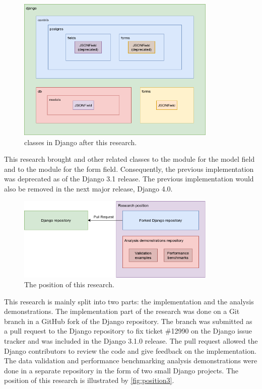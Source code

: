 \begin{figure}
	\centering
    \includegraphics[width=0.85\textwidth]{pics/position2.png}
	\caption{ classes in Django after this research.}
	\label{fig:position2}
\end{figure}

This research brought  and other related classes to the
 module for the model field and to the
 module for the form field. Consequently, the previous
implementation was deprecated as of the Django 3.1 release. The previous
implementation would also be removed in the next major release, Django 4.0.

\begin{figure}
	\centering
    \includegraphics[width=0.85\textwidth]{pics/position3.png}
	\caption{The position of this research.}
	\label{fig:position3}
\end{figure}

This research is mainly split into two parts: the 
implementation and the analysis demonstrations. The 
implementation part of the research was done on a Git branch in a GitHub fork
of the Django repository. The branch was submitted as a pull request to the
Django repository to fix ticket \#12990 on the Django issue tracker
\cite{ticket_12990} and was included in the Django 3.1.0 release. The pull
request allowed the Django contributors to review the code and give feedback
on the implementation. The data validation and performance benchmarking
analysis demonstrations were done in a separate repository in the form of
two small Django projects. The position of this research is illustrated by
\autoref{fig:position3}.

